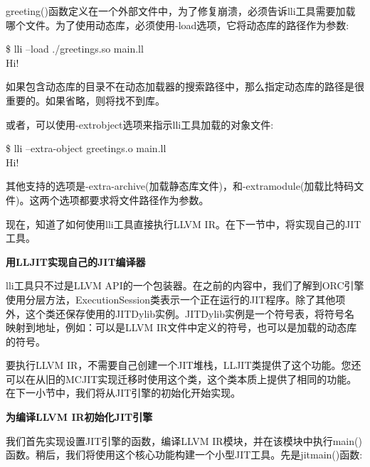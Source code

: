 greeting()函数定义在一个外部文件中，为了修复崩溃，必须告诉lli工具需要加载哪个文件。为了使用动态库，必须使用-load选项，它将动态库的路径作为参数:\par

\begin{tcolorbox}[colback=white,colframe=black]
\$ lli –load ./greetings.so main.ll \\
Hi!
\end{tcolorbox}

如果包含动态库的目录不在动态加载器的搜索路径中，那么指定动态库的路径是很重要的。如果省略，则将找不到库。\par

或者，可以使用-extrobject选项来指示lli工具加载的对象文件:\par

\begin{tcolorbox}[colback=white,colframe=black]
\$ lli –extra-object greetings.o main.ll \\
Hi!
\end{tcolorbox}

其他支持的选项是-extra-archive(加载静态库文件)，和-extramodule(加载比特码文件)。这两个选项都要求将文件路径作为参数。\par

现在，知道了如何使用lli工具直接执行LLVM IR。在下一节中，将实现自己的JIT工具。\par

\hspace*{\fill} \par %
\textbf{用LLJIT实现自己的JIT编译器}

lli工具只不过是LLVM API的一个包装器。在之前的内容中，我们了解到ORC引擎使用分层方法，ExecutionSession类表示一个正在运行的JIT程序。除了其他项外，这个类还保存使用的JITDylib实例。JITDylib实例是一个符号表，将符号名映射到地址，例如：可以是LLVM IR文件中定义的符号，也可以是加载的动态库的符号。\par

要执行LLVM IR，不需要自己创建一个JIT堆栈，LLJIT类提供了这个功能。您还可以在从旧的MCJIT实现迁移时使用这个类，这个类本质上提供了相同的功能。在下一小节中，我们将从JIT引擎的初始化开始实现。\par

\hspace*{\fill} \par %
\textbf{为编译LLVM IR初始化JIT引擎}

我们首先实现设置JIT引擎的函数，编译LLVM IR模块，并在该模块中执行main()函数。稍后，我们将使用这个核心功能构建一个小型JIT工具。先是jitmain()函数:\par

